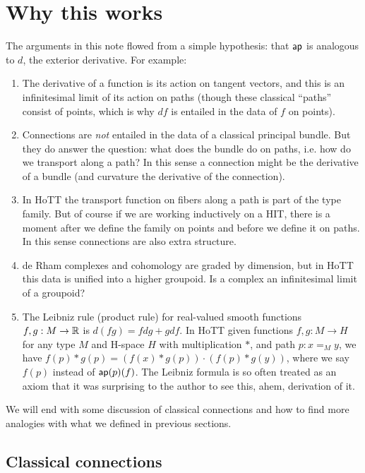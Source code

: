 \section{Why this works}

The arguments in this note flowed from a simple hypothesis: that \( \mathsf{ap} \) is analogous to \( d \), the exterior derivative. For example:

\begin{enumerate}
\item The derivative of a function is its action on tangent vectors, and this is an infinitesimal limit of its action on paths (though these classical ``paths'' consist of points, which is why \( df \) is entailed in the data of \( f \) on points).
\item Connections are \emph{not} entailed in the data of a classical principal bundle. But they do answer the question: what does the bundle do on paths, i.e. how do we transport along a path? In this sense a connection might be the derivative of a bundle (and curvature the derivative of the connection).
\item In HoTT the transport function on fibers along a path is part of the type family. But of course if we are working inductively on a HIT, there is a moment after we define the family on points and before we define it on paths. In this sense connections are also extra structure.
\item de Rham complexes and cohomology are graded by dimension, but in HoTT this data is unified into a higher groupoid. Is a complex an infinitesimal limit of a groupoid?
\item The Leibniz rule (product rule) for real-valued smooth functions \( f,g:M\to\mathbb{R} \) is \( d(fg)=fdg + gdf \). In HoTT given functions \( f,g:M\to H \) for any type \( M \) and H-space \( H \) with multiplication \( * \), and path \( p:x=_M y \), we have \( f(p)* g(p) = (f(x)* g(p))\cdot (f(p)*g(y)) \), where we say \( f(p) \) instead of \( \mathsf{ap}(p)(f) \). The Leibniz formula is so often treated as an axiom that it was surprising to the author to see this, ahem, derivation of it.
\end{enumerate}

We will end with some discussion of classical connections and how to find more analogies with what we defined in previous sections.

\subsection{Classical connections}

